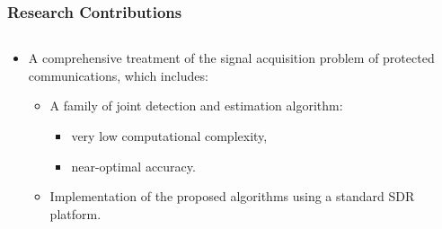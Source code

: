 \begin{frame}
    \frametitle{Research Contributions}

    \begin{columns}
      \begin{column}{0.54\textwidth}
        
        \begin{itemize}
          \item A comprehensive treatment of the signal acquisition problem of protected communications, which includes:      
          \begin{itemize}
              \item A family of joint detection and estimation algorithm:
              
              \begin{itemize}
                \item very low computational complexity, 
                \item near-optimal accuracy.
              \end{itemize}
              \item Implementation of the proposed algorithms using a standard SDR platform.
          \end{itemize} 
        \end{itemize}


\end{column}
\end{columns}
\end{frame}
